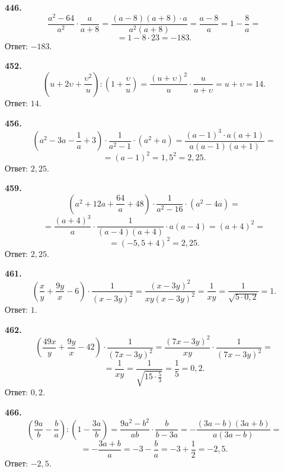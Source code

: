 \newpage\textbf{446.} $$\frac{a^2-64}{a^2}\cdot\frac{a}{a+8}=\frac{\left(a-8\right)\left(a+8\right)\cdot a}{a^2\left(a+8\right)}=\frac{a-8}{a}=1-\frac{8}{a}=$$ $$=1-8\cdot23=-183.$$ \newline \null \hspace*{\fill} Ответ: $-183$. 

\textbf{452.} $$\left(u+2\upsilon+\frac{\upsilon^2}{u}\right):\left(1+\frac{\upsilon}{u}\right)=\frac{\left(u+\upsilon\right)^2}{u}\cdot\frac{u}{u+\upsilon}=u+\upsilon=14.$$ \newline \null \hspace*{\fill} Ответ: $14$. 

\textbf{456.} $$\left(a^2-3a-\frac{1}{a}+3\right)\cdot\frac{1}{a^2-1}\cdot\left(a^2+a\right)=\frac{\left(a-1\right)^3\cdot a\left(a+1\right)}{a\left(a-1\right)\left(a+1\right)}=$$ $$=\left(a-1\right)^2=1,5^2=2,25.$$ \newline \null \hspace*{\fill} Ответ: $2,25$.

\textbf{459.} $$\left(a^2+12a+\frac{64}{a}+48\right)\cdot\frac{1}{a^2-16}\cdot\left(a^2-4a\right)=$$ $$=\frac{\left(a+4\right)^3}{a}\cdot\frac{1}{\left(a-4\right)\left(a+4\right)}\cdot a\left(a-4\right)=\left(a+4\right)^2=$$ $$=\left(-5,5+4\right)^2=2,25.$$ \newline \null \hspace*{\fill} Ответ: $2,25$.

\textbf{461.} $$\left(\frac{x}{y}+\frac{9y}{x}-6\right)\cdot\frac{1}{\left(x-3y\right)^2}=\frac{\left(x-3y\right)^2}{xy\left(x-3y\right)^2}=\frac{1}{xy}=\frac{1}{\sqrt{5\cdot0,2}}=1.$$ \newline \null \hspace*{\fill} Ответ: $1$. 

\textbf{462.} $$\left(\frac{49x}{y}+\frac{9y}{x}-42\right)\cdot\frac{1}{\left(7x-3y\right)^2}=\frac{\left(7x-3y\right)^2}{xy}\cdot\frac{1}{\left(7x-3y\right)^2}=$$ $$=\frac{1}{xy}=\frac{1}{\sqrt{15\cdot\frac{5}{3}}}=\frac{1}{5}=0,2.$$ \newline \null \hspace*{\fill} Ответ: $0,2$.

\textbf{466.} $$\left(\frac{9a}{b}-\frac{b}{a}\right):\left(1-\frac{3a}{b}\right)=\frac{9a^2-b^2}{ab}\cdot\frac{b}{b-3a}=-\frac{\left(3a-b\right)\left(3a+b\right)}{a\left(3a-b\right)}=$$ $$=-\frac{3a+b}{a}=-3-\frac{b}{a}=-3+\frac{1}{2}=-2,5.$$ \newline \null \hspace*{\fill} Ответ: $-2,5$.

